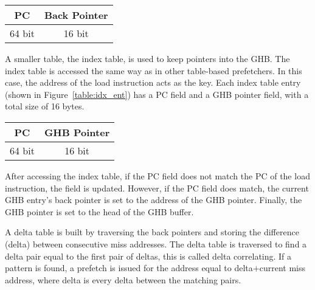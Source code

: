 \begin{center}
  \begin{tabular}{| c | c |}
    \hline
    PC & Back Pointer \\ \hline
    64 bit & 16 bit \\ \hline
  \end{tabular}
  \label{table:ghb_ent}
\end{center}

A smaller table, the index table, is used to keep pointers into the
GHB. The index table is accessed the same way as in other table-based
prefetchers. In this case, the address of the load instruction acts as
the key. Each index table entry (shown in Figure~\ref{table:idx_ent})
has a PC field and a GHB pointer field, with a total size of 16 bytes.

\begin{center}
  \begin{tabular}{| c | c |}
    \hline
    PC & GHB Pointer \\ \hline
    64 bit & 16 bit \\ \hline
  \end{tabular}
  \label{table:idx_ent}
\end{center}

After accessing the index table, if the PC field does not match the PC
of the load instruction, the field is updated. However, if the PC
field does match, the current GHB entry's back pointer is set to the
address of the GHB pointer. Finally, the GHB pointer is set to the
head of the GHB buffer.

A delta table is built by traversing the back pointers and storing the
difference (delta) between consecutive miss addresses. The delta table
is traversed to find a delta pair equal to the first pair of deltas,
this is called delta correlating. If a pattern is found, a prefetch is
issued for the address equal to delta$+$current miss address, where
delta is every delta between the matching pairs.
